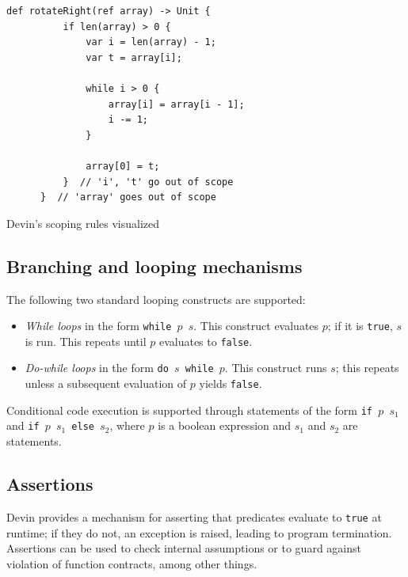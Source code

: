 \documentclass[UdineBachThesis,american,11pt]{PhdThesis}
\begin{document}
  \begin{Listing}[H]
    \begin{Verbatim}[gobble=6,fontsize=\small]
      def rotateRight(ref array) -> Unit {
          if len(array) > 0 {
              var i = len(array) - 1;
              var t = array[i];

              while i > 0 {
                  array[i] = array[i - 1];
                  i -= 1;
              }

              array[0] = t;
          }  // 'i', 't' go out of scope
      }  // 'array' goes out of scope
    \end{Verbatim}

    \caption{Devin's scoping rules visualized}
  \end{Listing}

  \newpage

  \subsection{Branching and looping mechanisms}

  The following two standard looping constructs are supported:

  \begin{itemize}
    \item \emph{While loops} in the form \mbox{\texttt{while $p$ $s$}}. This
    construct evaluates $p$; if it is \mbox{\texttt{true}}, $s$ is run. This
    repeats until $p$ evaluates to \mbox{\texttt{false}}.

    \item \emph{Do-while loops} in the form \mbox{\texttt{do $s$ while $p$}}.
    This construct runs $s$; this repeats unless a subsequent evaluation of $p$
    yields \mbox{\texttt{false}}.
  \end{itemize}

  Conditional code execution is supported through statements of the form
  \mbox{\texttt{if $p$ $s_1$}} and \mbox{\texttt{if $p$ $s_1$ else $s_2$}},
  where $p$ is a boolean expression and $s_1$ and $s_2$ are statements.

  \subsection{Assertions}

  Devin provides a mechanism for asserting that predicates evaluate to
  \mbox{\texttt{true}} at runtime; if they do not, an exception is raised,
  leading to program termination. Assertions can be used to check internal
  assumptions or to guard against violation of function contracts, among other
  things.
\end{document}
